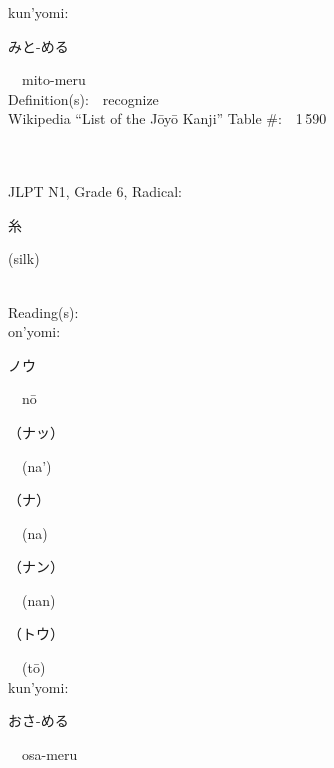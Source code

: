 \begin{multicols}{2}
{\hspace*{1em}}kun'yomi:\ \ \\
{\hspace*{2em}}{\begin{CJK}{UTF8}{min} みと-める \end{CJK}}\ \ mito-meru\ \ \\
Definition(s):\ \ recognize \\
Wikipedia ``List of the J\=oy\=o Kanji'' Table \#:\ \ 1\,590 \\
\ \ \\
{\fontsize{34pt}{40pt}  }\ \ \\  %
{JLPT N1, Grade 6, Radical:\ \ {\begin{CJK}{UTF8}{min} 糸 \end{CJK}} (silk) } \\
Reading(s):\ \ \\
{\hspace*{1em}}on'yomi:\ \ \\
{\hspace*{2em}}{\begin{CJK}{UTF8}{min} ノウ \end{CJK}}\ \ n\=o\ \ \\
{\hspace*{2em}}{\begin{CJK}{UTF8}{min} （ナッ） \end{CJK}}\ \ (na')\ \ \\
{\hspace*{2em}}{\begin{CJK}{UTF8}{min} （ナ） \end{CJK}}\ \ (na)\ \ \\
{\hspace*{2em}}{\begin{CJK}{UTF8}{min} （ナン） \end{CJK}}\ \ (nan)\ \ \\
{\hspace*{2em}}{\begin{CJK}{UTF8}{min} （トウ） \end{CJK}}\ \ (t\=o)\ \ \\
{\hspace*{1em}}kun'yomi:\ \ \\
{\hspace*{2em}}{\begin{CJK}{UTF8}{min} おさ-める \end{CJK}}\ \ osa-meru\ \ \\

\end{multicols}
